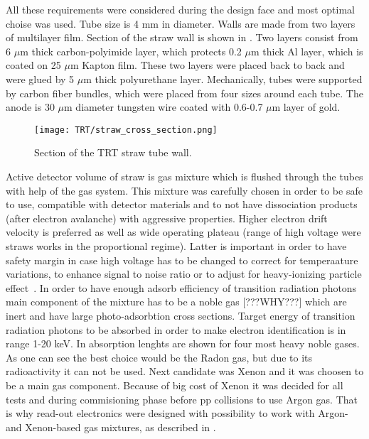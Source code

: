 All these requirements were considered during the design face and most optimal choise was used.
Tube size is 4 mm in diameter. Walls are made from two layers of multilayer film. Section of the straw wall is shown in .
Two layers consist from 6 $\mu$m thick carbon-polyimide layer, which protects 0.2 $\mu$m thick Al layer, which is coated on 25 $\mu$m Kapton film.
These two layers were placed back to back and were glued by 5 $\mu$m thick polyurethane layer.
Mechanically, tubes were supported by carbon fiber bundles, which were placed from four sizes around each tube.
The anode is 30 $\mu$m diameter tungsten wire coated with 0.6-0.7 $\mu$m layer of gold.

\begin{figure}
\centering
\texttt{[image: TRT/straw\_cross\_section.png]}
\caption{ 
Section of the TRT straw tube wall.
}
\label{fig:straw_wall_section}
\end{figure}

Active detector volume of straw is gas mixture which is flushed through the tubes with help of the gas system.
This mixture was carefully chosen in order to be safe to use, compatible with detector materials and to not have dissociation products (after electron avalanche) with aggressive properties.
Higher electron drift velocity is preferred as well as wide operating plateau (range of high voltage were straws works in the proportional regime). Latter is important in order to have 
safety margin in case high voltage has to be changed to correct for temperaature variations, to enhance signal to noise ratio or to adjust for heavy-ionizing particle effect~\cite{Abat:2008zza}.
In order to have enough adsorb efficiency of transition radiation photons main component of the mixture has to be a noble gas [???WHY???] which are inert and have 
large photo-adsorbtion cross sections.
Target energy of transition radiation photons to be absorbed in order to make electron identification is in range 1-20 keV.
In  absorption lenghts are shown for four most heavy noble gases.
As one can see the best choice would be the Radon gas, but due to its radioactivity it can not be used.
Next candidate was Xenon and it was choosen to be a main gas component.
Because of big cost of Xenon it was decided for all tests and during commisioning phase before pp collisions to use Argon gas. That is why read-out electronics were
designed with possibility to work with Argon- and Xenon-based gas mixtures, as described in .

